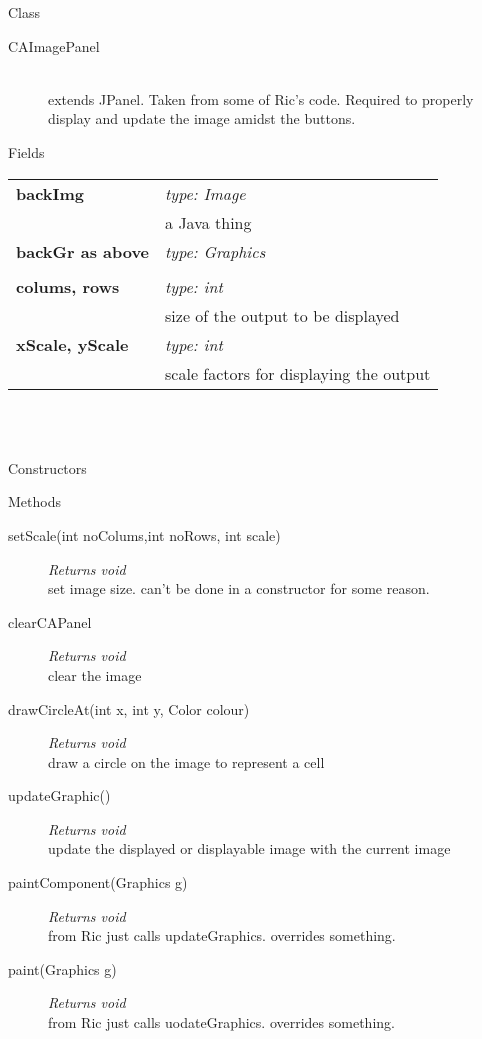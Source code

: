 \documentclass[11pt,a4paper]{article}
\newcommand \bt{\begin{tabular*}{0.99\textwidth}{p{0.25\textwidth}p{0.74\textwidth}}}
\newcommand \et{\end{tabular*}\\}
\newcommand{\hs}{\hspace{0.5cm}}
\newenvironment{di}
{\begin{flushright}
\begin{minipage}{0.95\textwidth}
\begin{description}
}
{\end{description}
\end{minipage}
\end{flushright}
}
\begin{document}
\noindent
\colorbox{classbg}{\parbox{1.0\textwidth}{\Large{Class}}}
\begin{di}
\item[\large{CAImagePanel}]\qquad\\
extends JPanel. Taken from some of Ric's code. Required to properly display and update the image amidst the buttons.
\end{di}
\colorbox{fieldbg}{\parbox{1.0\textwidth}{\Large{Fields}}}\vspace{0.5cm}
\bt
\hs \textbf{backImg} & \emph{type: Image}\\
& \hs a Java thing\\
\hs \textbf{backGr as above} & \emph{type: Graphics}\\
& \hs \\
\hs \textbf{colums, rows} & \emph{type: int}\\
& \hs size of the output to be displayed\\
\hs \textbf{xScale, yScale} & \emph{type: int}\\
& \hs scale factors for displaying the output\\
\et
\\\colorbox{conbg}{\parbox{1.0\textwidth}{\Large{Constructors}}}
\colorbox{descriptbg}{\parbox{1.0\textwidth}{\Large{Methods}}}
\begin{di}
\item[setScale(int noColums,int noRows, int scale)]\emph{Returns void}\\
set image size. can't be done in a constructor for some reason.\\
\item[clearCAPanel]\emph{Returns void}\\
clear the image\\
\item[drawCircleAt(int x, int y, Color colour)]\emph{Returns void}\\
draw a circle on the image to represent a cell\\
\item[updateGraphic()]\emph{Returns void}\\
update the displayed or displayable image with the current image\\
\item[paintComponent(Graphics g)]\emph{Returns void}\\
from Ric just calls updateGraphics. overrides something.\\
\item[paint(Graphics g)]\emph{Returns void}\\
from Ric just calls uodateGraphics. overrides something.\\
\end{di}
\end{document}

